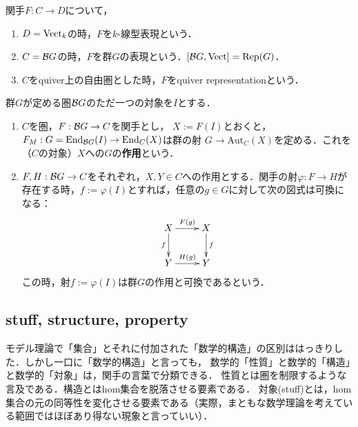 \documentclass[uplatex,dvipdfmx]{jsreport}
\begin{document}
\begin{definition}
    関手$F:C\to D$について，
    \begin{enumerate}
        \item $D=\mathrm{Vect}_k$の時，$F$を$k$-線型表現という．
        \item $C=\mathcal{B} G$の時，$F$を群$G$の表現という．$[\mathcal{B} G,\mathrm{Vect}]=\mathrm{Rep}(G)$．
        \item $C$をquiver上の自由圏とした時，$F$をquiver representationという．
    \end{enumerate}
\end{definition}

\begin{definition}
    群$G$が定める圏$\mathcal{B} G$のただ一つの対象を$I$とする．
    \begin{enumerate}
        \item $C$を圏，$F:\mathcal{B} G\to C$を関手とし，
        $X:=F(I)$とおくと，$F_M:G=\mathrm{End}_{\mathcal{B} G}(I)\to \mathrm{End}_C(X)$は群の射
        $G\to\mathrm{Aut}_C(X)$を定める．これを（$C$の対象）$X$への$G$の\textbf{作用}という．
        \item $F,H:\mathcal{B} G\to C$をそれぞれ，$X,Y\in C$への作用とする．関手の射$\varphi:F\to H$が存在する時，$f:=\varphi(I)$とすれば，任意の$g\in G$に対して次の図式は可換になる：
        \[\xymatrix{
            X\ar[r]^-{F(g)}\ar[d]_-f&X\ar[d]^-f\\
            Y\ar[r]^-{H(g)}&Y
        }\]
        この時，射$f:=\varphi(I)$は群$G$の作用と可換であるという．
    \end{enumerate}
\end{definition}

\subsection{stuff, structure, property}

\begin{tcolorbox}[colframe=ForestGreen, colback=ForestGreen!10!white,breakable,colbacktitle=ForestGreen!40!white,coltitle=black,fonttitle=\bfseries\sffamily,
title=]
    モデル理論で「集合」とそれに付加された「数学的構造」の区別ははっきりした．しかし一口に「数学的構造」と言っても，
    数学的「性質」と数学的「構造」と数学的「対象」は，関手の言葉で分類できる．
    性質とは圏を制限するような言及である．構造とはhom集合を脱落させる要素である．
    対象(stuff)とは，hom集合の元の同等性を変化させる要素である（実際，まともな数学理論を考えている範囲ではほぼあり得ない現象と言っていい）．
\end{tcolorbox}
\end{document}
